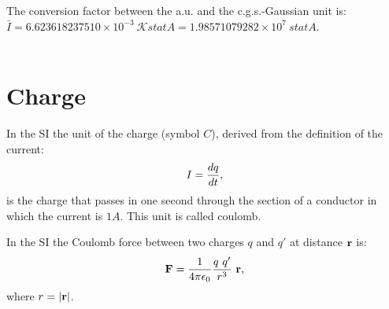 \documentclass[12pt,a4paper]{article}
\def\bari{6.623618237510\times 10^{-3}}
\def\kappaa{1.000000000274\times 10^{-1}}
\def\baricgs{1.98571079282\times 10^{7}}
\begin{document}
%

{\color{green} The conversion factor between the a.u. and the c.g.s.-Gaussian 
unit is: $\bar I=\bari\ \mathcal{K} statA=\baricgs\ statA$. \\
}
\\

\newpage
\section{\color{coral}Charge}
In the SI the unit of the charge (symbol $C$), derived from the definition 
of the current:
\begin{equation}
I={dq \over dt},
\label{current}
\end{equation}
is the charge that passes in one second through the section of a conductor
in which the current is $1 A$. This unit is called coulomb.

In the SI the Coulomb force between two charges $q$ and $q'$ at
distance ${\bf r}$ is:
\begin{equation}
{\bf F} = {1\over 4 \pi \epsilon_0} {q\ q' \over r^3}\ {\bf r},
\label{coulomb}
\end{equation}
where $r=|{\bf r}|$.
\\
\end{document}
